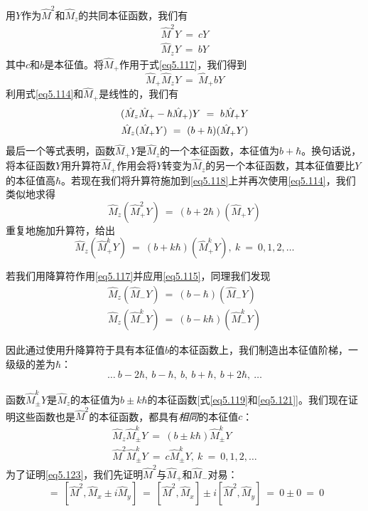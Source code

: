 \documentclass[12pt,a4paper,openany]{ctexbook}
\begin{document}
\begin{flushleft}
用$Y$作为$\hat{M}^2$和$\hat{M}_z$的共同本征函数，我们有
\begin{align}
    \hat{M}^2Y\ =\ cY \label{eq5.116} \\
    \hat{M}_zY\ =\ bY \label{eq5.117}
\end{align}
其中$c$和$b$是本征值。将$\hat{M}_+$作用于式\eqref{eq5.117}，我们得到
\begin{equation*}
    \hat{M}_+\hat{M}_zY\ =\ \hat{M}_+bY 
\end{equation*}
利用式\eqref{eq5.114}和$\hat{M}_+$是线性的，我们有
\begin{gather}
    (\hat{M}_z\hat{M}_+-\hbar\hat{M}_+)Y\ =\ b\hat{M}_+Y \notag \\
    \hat{M}_z(\hat{M}_+Y)\ =\ (b+\hbar)(\hat{M}_+Y) \label{eq5.118}
\end{gather}
最后一个等式表明，函数$\hat{M}_+Y$是$\hat{M}_z$的一个本征函数，本征值为$b+\hbar$。换句话说，将本征函数$Y$用升算符$\hat{M}_+$作用会将$Y$转变为$\hat{M}_z$的另一个本征函数，其本征值要比$Y$的本征值高$\hbar$。若现在我们将升算符施加到\eqref{eq5.118}上并再次使用\eqref{eq5.114}，我们类似地求得
\begin{equation*}
    \hat{M}_z(\hat{M}_+^2Y)\ =\ (b+2\hbar)(\hat{M}_+Y)
\end{equation*}
重复地施加升算符，给出
\begin{equation}
    \hat{M}_z(\hat{M}_+^kY)\ =\ (b+k\hbar)(\hat{M}_+^kY),\ k\ =\ 0,1,2,\dots \label{eq5.119}
\end{equation}

若我们用降算符作用\eqref{eq5.117}并应用\eqref{eq5.115}，同理我们发现
\begin{gather}
    \hat{M}_z(\hat{M}_-Y)\ =\ (b-\hbar)(\hat{M}_-Y) \label{eq5.120} \\
    \hat{M}_z(\hat{M}_-^kY)\ =\ (b-k\hbar)(\hat{M}_-^kY) \label{eq5.121}
\end{gather}

因此通过使用升降算符于具有本征值$b$的本征函数上，我们制造出本征值阶梯，一级级的差为$\hbar$：
\begin{equation*}
    \dots\ b-2\hbar,\ b-\hbar,\ b,\ b+\hbar,\ b+2\hbar,\ \dots 
\end{equation*}

函数$\hat{M}_{\pm}^kY$是$\hat{M}_z$的本征值为$b\pm k\hbar$的本征函数[式\eqref{eq5.119}和\eqref{eq5.121}]。我们现在证明这些函数也是$\hat{M}^2$的本征函数，都具有\textit{相同}的本征值$c$：
\begin{gather}
    \hat{M}_z\hat{M}_{\pm}^kY\ =\ (b\pm k\hbar)\hat{M}_{\pm}^kY \label{eq5.122} \\
    \hat{M}^2\hat{M}_{\pm}^kY\ =\ c\hat{M}_{\pm}^kY,\ k\ =\ 0,1,2,\dots \label{eq5.123}
\end{gather}
为了证明\eqref{eq5.123}，我们先证明$\hat{M}^2$与$\hat{M}_+$和$\hat{M}_-$对易：
\begin{equation*}
    [\hat{M}^2,\hat{M}_{\pm}]\ =\ [\hat{M}^2,\hat{M}_x\pm i\hat{M}_y]\ =\ [\hat{M}^2,\hat{M}_x]\pm i[\hat{M}^2,\hat{M}_y]\ =\ 0\pm0\ =\ 0 
\end{equation*}


\end{flushleft}
\end{document}
